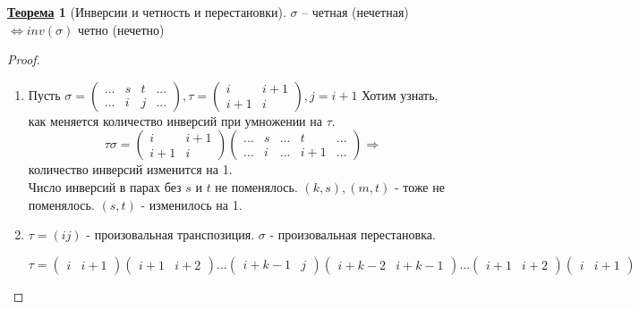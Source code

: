 \documentclass[12pt]{article}
\newenvironment{MyList}[1][4pt]{
  \begin{enumerate}[1.]
  \setlength{\parskip}{0pt}
  \setlength{\itemsep}{#1}
}{       
  \end{enumerate}
}
\theoremstyle{definition} %
\newtheorem{Thm}{\underline{Теорема}}[subsection] %
\theoremstyle{plain} %
\theoremstyle{remark} %
\begin{document}
{\begin{Thm}[Инверсии и четность и перестановки]
    $\sigma$ -- четная (нечетная) $\Leftrightarrow inv(\sigma)$ четно (нечетно) 
\end{Thm}

\begin{proof}
    \begin{MyList}
        \item Пусть $\sigma = \left(\begin{array}{cccc}
        ... & s & t & ... \\ 
        ... & i & j & ...
        \end{array}\right), \tau = \left(\begin{array}{cc}
        i & i + 1 \\ 
        i + 1 & i
        \end{array}\right), j = i + 1$ 
        Хотим узнать, как меняется количество инверсий при умножении на $\tau$.
        \[\tau \sigma = \left(\begin{array}{cc}
        i & i + 1 \\ 
        i + 1 & i
        \end{array}\right) \left(\begin{array}{ccccc}
        ... & s & ... & t & ... \\ 
        ... & i & ... & i + 1 & ...
        \end{array}\right) \Rightarrow\] 
        количество инверсий изменится на 1. \\
        Число инверсий в парах без $s$ и $t$ не поменялось. $(k, s), (m, t)$ - тоже не поменялось. $(s, t)$ - изменилось на 1.
        \item $\tau = (ij)$ - произовальная транспозиция. $\sigma$ - произовальная перестановка.
        
        $\tau = \left(\begin{array}{cc}
        i & i + 1
        \end{array}\right) \left(\begin{array}{cc}
        i + 1 & i + 2
        \end{array}\right) ... \left(\begin{array}{cc}
        i + k - 1 & j
        \end{array}\right) \left(\begin{array}{cc}
        i + k - 2 & i + k - 1
        \end{array}\right) ... \left(\begin{array}{cc}
        i + 1 & i + 2
        \end{array}\right) \left(\begin{array}{cc}
        i & i + 1
        \end{array}\right)$ 


\end{MyList}
\end{proof}}
\end{document}

